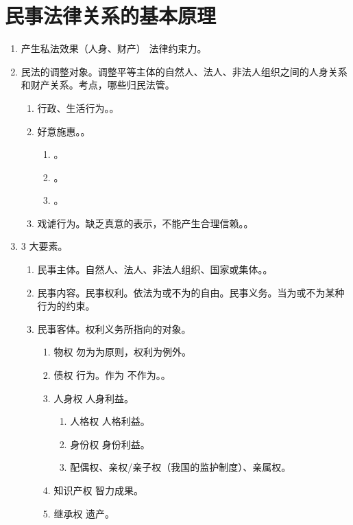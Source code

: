 \section{民事法律关系的基本原理}
\begin{enumerate}
  \item 产生私法效果（人身、财产） \yjt 法律约束力。
  \item 民法的调整对象。调整平等主体的自然人、法人、非法人组织之间的人身关系和财产关系。考点，哪些归民法管。
        \begin{enumerate}
          \item 行政、生活行为。。
          \item 好意施惠。。
                \begin{enumerate}
                  \item {}。
                  \item {}。
                  \item {}。
                \end{enumerate}
          \item 戏谑行为。缺乏真意的表示，不能产生合理信赖。。
        \end{enumerate}
  \item 3 大要素。
        \begin{enumerate}
          \item 民事主体。自然人、法人、非法人组织、国家或集体。。
          \item 民事内容。\yi 民事权利。依法为或不为的自由。\er 民事义务。当为或不为某种行为的约束。
          \item 民事客体。权利义务所指向的对象。
                \begin{enumerate}
                  \item 物权 \yjt 勿为为原则，权利为例外。
                  \item 债权 \yjt 行为。作为 \hz 不作为。。
                  \item 人身权 \yjt 人身利益。
                        \begin{enumerate}
                          \item 人格权 \yjt 人格利益。
                          \item 身份权 \yjt 身份利益。
                          \item 配偶权、亲权/亲子权（我国的监护制度）、亲属权。
                        \end{enumerate}
                  \item 知识产权 \yjt 智力成果。
                  \item 继承权 \yjt 遗产。
                \end{enumerate}
        \end{enumerate}
\end{enumerate}
